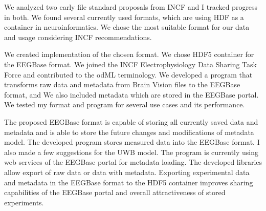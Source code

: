 \documentclass[conference]{IEEEtran}
\begin{document}
We analyzed two early file standard proposals from INCF and I tracked progress in both. We found several currently used formats, which are using HDF as a container in neuroinformatics. We chose the most suitable format for our data and usage considering INCF recommendations.

We created implementation of the chosen format. We chose HDF5 container for the EEGBase format. We joined the INCF Electrophysiology Data Sharing Task Force and contributed to the odML terminology. We developed a program that transforms raw data and metadata from Brain Vision files to the EEGBase format, and We also included metadata which are stored in the EEGBase portal. We tested my format and program for several use cases and its performance.

The proposed EEGBase format is capable of storing all currently saved data and metadata and is able to store the future changes and modifications of metadata model. The developed program stores measured data into the EEGBase format. I also made a few suggestions for the UWB model. The program is currently using web services of the EEGBase portal for metadata loading. The developed libraries allow export of raw data or data with metadata. Exporting experimental data and metadata in the EEGBase format to the HDF5 container improves sharing capabilities of the EEGBase portal and overall attractiveness of stored experiments.














%
%
%
\end{document}
